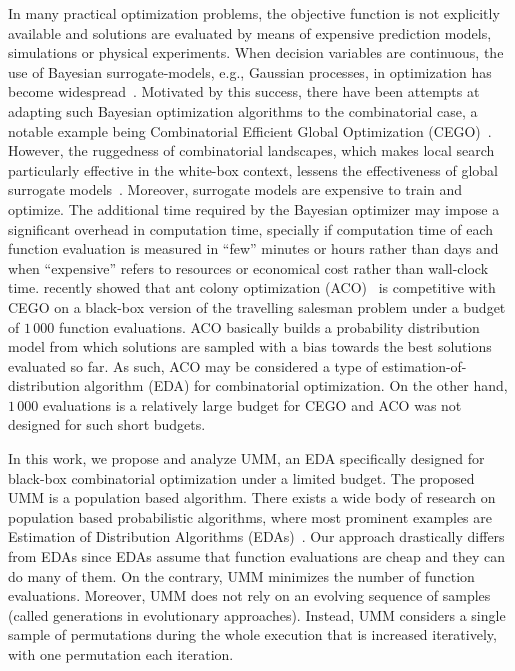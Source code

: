 \documentclass[runningheads]{llncs}
\begin{document}
In many practical optimization problems, the objective function is not
explicitly available and solutions are evaluated by means of expensive
prediction models, simulations or physical experiments. When decision variables
are continuous, the use of Bayesian surrogate-models, e.g., Gaussian processes,
in optimization has become
widespread~\citep{JonSchWel98go,ForKea2009surrogate}. Motivated by this
success, there have been attempts at adapting such Bayesian optimization
algorithms to the combinatorial case, a notable example being Combinatorial
Efficient Global Optimization
(CEGO)~\citep{ZaeStoBar2014:ppsn,ZaeStoFriFisNauBar2014}. However, the
ruggedness of combinatorial landscapes, which makes local search particularly
effective in the white-box context, lessens the effectiveness of global
surrogate models~\citep{EriPeaGar2019scalable}. Moreover, surrogate models are
expensive to train and optimize. The additional time required by the Bayesian
optimizer may impose a significant overhead in computation time, specially if
computation time of each function evaluation is measured in ``few'' minutes or
hours rather than days and when ``expensive'' refers to resources or economical
cost rather than wall-clock time. \citet{PerLopStu2015si} recently showed that
ant colony optimization (ACO)~\citep{DorStu2004:book} is competitive with CEGO
on a black-box version of the travelling salesman problem under a budget of
$1\,000$ function evaluations. ACO basically builds a probability distribution
model from which solutions are sampled with a bias towards the best solutions
evaluated so far. As such, ACO may be considered a type of
estimation-of-distribution algorithm (EDA) for combinatorial optimization. On
the other hand, $1\,000$ evaluations is a relatively large budget for CEGO and
ACO was not designed for such short budgets.





In this work, we propose and analyze UMM, an EDA specifically designed for
black-box combinatorial optimization under a limited budget. The proposed UMM 
is a population based algorithm. There exists a wide body of research on population based probabilistic algorithms, where most prominent examples are Estimation of Distribution Algorithms (EDAs)~\citep{???}. Our approach drastically differs from EDAs since EDAs assume that function evaluations are cheap and they can do many of them. On the contrary, UMM minimizes the number of function evaluations. Moreover, UMM does not rely on an evolving sequence of samples (called generations in evolutionary approaches). Instead, UMM considers a single sample of permutations during the whole execution that is increased iteratively, with one permutation each iteration.
\end{document}
